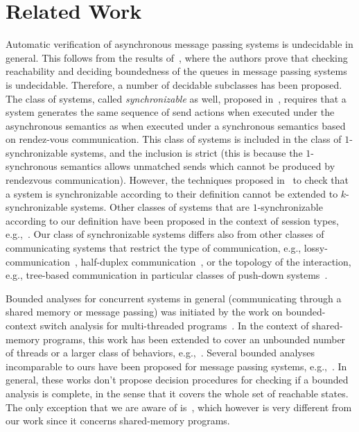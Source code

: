 \section{Related Work}

Automatic verification of asynchronous message passing systems is undecidable in general. This follows from the results of~\cite{DBLP:journals/jacm/BrandZ83}, where the authors prove that checking reachability and deciding boundedness of the queues in message passing systems is undecidable. 
Therefore, a number of decidable subclasses has been proposed. 
The class of systems, called \emph{synchronizable} as well, proposed in~\cite{DBLP:journals/tcs/BasuB16}, requires that a system generates the same sequence of send actions when executed under the asynchronous semantics as when executed under a synchronous semantics based on rendez-vous communication. This class of systems is included in the class of $1$-synchronizable systems, and the inclusion is strict (this is because the $1$-synchronous semantics allows unmatched sends which cannot be produced by rendezvous communication). However, the techniques proposed in~\cite{DBLP:journals/tcs/BasuB16} to check that a system is synchronizable according to their definition cannot be extended to $k$-synchronizable systems.
Other classes of systems that are $1$-synchronizable according to our definition have been proposed in the context of session types, e.g.,~\cite{DBLP:conf/esop/DenielouY12,DBLP:journals/jacm/HondaYC16,DBLP:conf/esop/HondaVK98,DBLP:conf/popl/LangeTY15}. 
Our class of synchronizable systems differs also from other classes of communicating systems that restrict the type of communication, e.g., lossy-communication~\cite{DBLP:journals/iandc/AbdullaJ96}, half-duplex communication~\cite{DBLP:journals/iandc/CeceF05}, or the topology of the interaction, e.g., tree-based communication in particular classes of push-down systems~\cite{DBLP:conf/tacas/TorreMP08,DBLP:journals/corr/abs-1209-0359}.

Bounded analyses for concurrent systems in general (communicating through a shared memory or message passing) was initiated by the work on bounded-context switch analysis for multi-threaded programs~\cite{DBLP:conf/pldi/QadeerW04,DBLP:conf/tacas/QadeerR05,DBLP:conf/cav/LalR08}. In the context of shared-memory programs, this work has been extended to cover an unbounded number of threads or a larger class of behaviors, e.g.,~\cite{DBLP:conf/sas/BouajjaniEP11,DBLP:conf/popl/EmmiQR11,DBLP:conf/spin/KiddJV10,DBLP:conf/cav/TorreMP10}. Several bounded analyses incomparable to ours have been proposed for message passing systems, e.g.,~\cite{DBLP:conf/tacas/TorreMP08, DBLP:conf/tacas/BouajjaniE12}. In general, these works don't propose decision procedures for checking if a bounded analysis is complete, in the sense that it covers the whole set of reachable states. The only exception that we are aware of is~\cite{DBLP:conf/cav/TorreMP10}, which however is very different from our work since it concerns shared-memory programs.

